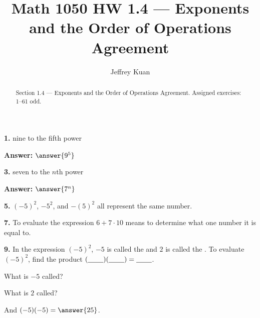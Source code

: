 \documentclass{ximera}
\author{Jeffrey Kuan}
\title{Math 1050 HW 1.4 --- Exponents and the Order of Operations Agreement}
\begin{document}
\begin{abstract}
    Section 1.4 --- Exponents and the Order of Operations Agreement.
    Assigned exercises: 1–61 odd.
\end{abstract}

\maketitle

\begin{problem}
\textbf{1.} nine to the fifth power

\textbf{Answer:} $\answer{9^5}$
\end{problem}

\begin{problem}
\textbf{3.} seven to the $n$th power

\textbf{Answer:} $\answer{7^n}$
\end{problem}

\begin{problem}
\textbf{5.} $(-5)^2$, $-5^2$, and $-(5)^2$ all represent the same number.

\begin{multipleChoice}
\end{multipleChoice}
\end{problem}

\begin{problem}
\textbf{7.} To evaluate the expression $6 + 7 \cdot 10$ means to determine what one number it
  is equal to.

\begin{multipleChoice}
\end{multipleChoice}
\end{problem}

\begin{problem}
\textbf{9.} In the expression $(-5)^2$, $-5$ is called the \blank{} and $2$ is called the
  \blank. To evaluate $(-5)^2$, find the product $(\underline{\hspace{2.2em}})(\underline{\hspace{2.2em}}) = \underline{\hspace{2.2em}}$.

What is $-5$ called?

\begin{multipleChoice}
\end{multipleChoice}

What is $2$ called?

\begin{multipleChoice}
\end{multipleChoice}

And $(-5)(-5) = \answer{25}$.
\end{problem}
\end{document}
